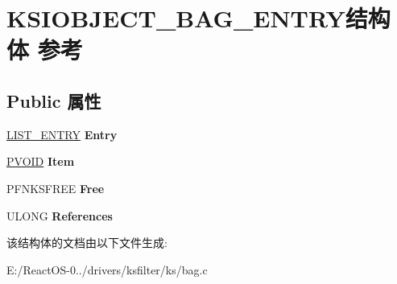 \hypertarget{struct_k_s_i_o_b_j_e_c_t___b_a_g___e_n_t_r_y}{}\section{K\+S\+I\+O\+B\+J\+E\+C\+T\+\_\+\+B\+A\+G\+\_\+\+E\+N\+T\+R\+Y结构体 参考}
\label{struct_k_s_i_o_b_j_e_c_t___b_a_g___e_n_t_r_y}
\subsection*{Public 属性}
\begin{DoxyCompactItemize}
\item 
\mbox{\label{struct_k_s_i_o_b_j_e_c_t___b_a_g___e_n_t_r_y_a3dc3a1e032011b2d844d3f5799c83cee}} 
\hyperlink{struct___l_i_s_t___e_n_t_r_y}{L\+I\+S\+T\+\_\+\+E\+N\+T\+RY} {\bfseries Entry}
\item 
\mbox{\label{struct_k_s_i_o_b_j_e_c_t___b_a_g___e_n_t_r_y_a2895f8f181189e153474910cb5259e54}} 
\hyperlink{interfacevoid}{P\+V\+O\+ID} {\bfseries Item}
\item 
\mbox{\label{struct_k_s_i_o_b_j_e_c_t___b_a_g___e_n_t_r_y_af3919b3eea0d71a9ceb3f0fd0498ef2e}} 
P\+F\+N\+K\+S\+F\+R\+EE {\bfseries Free}
\item 
\mbox{\label{struct_k_s_i_o_b_j_e_c_t___b_a_g___e_n_t_r_y_a266f0e2ba7512094eeb4929456cefa1f}} 
U\+L\+O\+NG {\bfseries References}
\end{DoxyCompactItemize}


该结构体的文档由以下文件生成\+:\begin{DoxyCompactItemize}
\item 
E\+:/\+React\+O\+S-\/0../drivers/ksfilter/ks/bag.\+c\end{DoxyCompactItemize}
